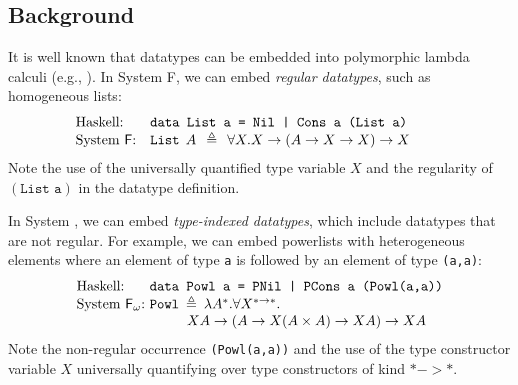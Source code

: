 \subsection{Background}

It is well known that datatypes can be embedded into polymorphic lambda calculi
(e.g., \cite{AbeMatUus03}).  In System \textsf{F}, we can embed \emph{regular datatypes},
such as homogeneous lists:
\[\!\!\!\!\!\!\!\!\!
\begin{array}{ll}
\text{Haskell:} & \texttt{data List a = Nil | Cons a (List a)} \\
\text{System \textsf{F}:} & \texttt{{List}}\:\: A\:\:\triangleq\:\:\forall X.X\to(A\to X\to X)\to X ~~\;
\end{array}
\]
Note the use of the universally quantified type variable $X$
and the regularity of $(\texttt{List a})$ in the datatype definition.

In System \Fw, we can embed \emph{type-indexed datatypes}, which include
datatypes that are not regular. For example, we can embed powerlists with
heterogeneous elements where an element of type \texttt{a} is followed by
an element of type \texttt{(a,a)}:
\[
\begin{array}{ll}
\text{Haskell:} & \!\!\!\!\texttt{data Powl a = PNil | PCons a (Powl(a,a))} \\
\text{System \Fw:} & \!\!\!\!\texttt{{Powl}}\:\triangleq\:
\lambda A^{*}.\forall X^{*\to*}.\\ \qquad
& \qquad X A\to (A\to X(A\times A)\to X A)\to XA
\end{array}
\]
Note the non-regular occurrence \texttt{(Powl(a,a))} and
the use of the type constructor variable $X$ universally quantifying over
type constructors of kind $* -> *$.\\


